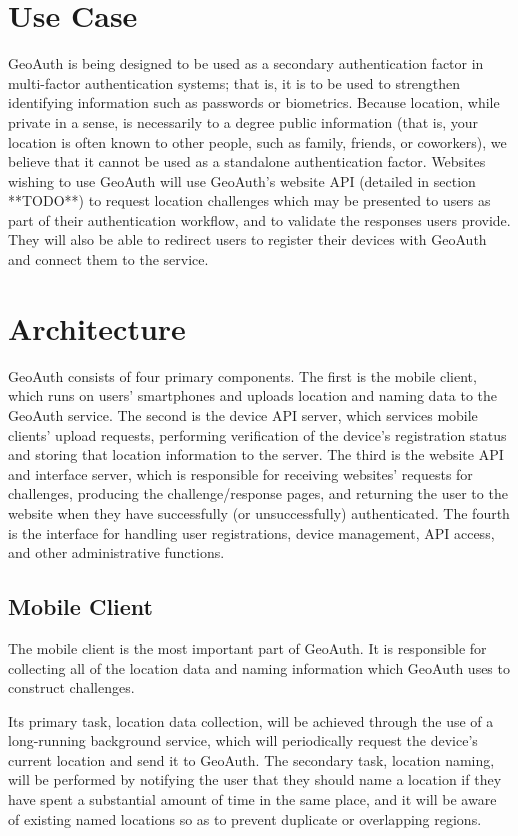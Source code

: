 \documentclass[11pt]{article} %
\begin{document}
\section{Use Case}
GeoAuth is being designed to be used as a secondary authentication factor in multi-factor authentication systems; that is, it is to be used to strengthen identifying information such as passwords or biometrics. Because location, while private in a sense, is necessarily to a degree public information (that is, your location is often known to other people, such as family, friends, or coworkers), we believe that it cannot be used as a standalone authentication factor. Websites wishing to use GeoAuth will use GeoAuth's website API (detailed in section **TODO**) to request location challenges which may be presented to users as part of their authentication workflow, and to validate the responses users provide. They will also be able to redirect users to register their devices with GeoAuth and connect them to the service.

\section{Architecture}
GeoAuth consists of four primary components. The first is the mobile client, which runs on users' smartphones and uploads location and naming data to the GeoAuth service. The second is the device API server, which services mobile clients' upload requests, performing verification of the device's registration status and storing that location information to the server. The third is the website API and interface server, which is responsible for receiving websites' requests for challenges, producing the challenge/response pages, and returning the user to the website when they have successfully (or unsuccessfully) authenticated. The fourth is the interface for handling user registrations, device management, API access, and other administrative functions.

\subsection{Mobile Client}
The mobile client is the most important part of GeoAuth. It is responsible for collecting all of the location data and naming information which GeoAuth uses to construct challenges.

Its primary task, location data collection, will be achieved through the use of a long-running background service, which will periodically request the device's current location and send it to GeoAuth. The secondary task, location naming, will be performed by notifying the user that they should name a location if they have spent a substantial amount of time in the same place, and it will be aware of existing named locations so as to prevent duplicate or overlapping regions.
\end{document}
